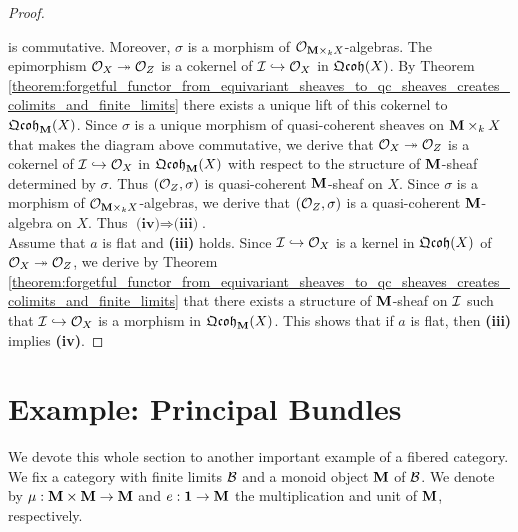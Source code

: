 \begin{proof}
\begin{center}
\end{center}
is commutative. Moreover, $\sigma$ is a morphism of ${\mathcal O}_{\mathbf{M}\times_k X}$-algebras. The epimorphism ${\mathcal O}_X\twoheadrightarrow {\mathcal O}_Z$ is a cokernel of ${\mathcal I}\hookrightarrow {\mathcal O}_X$ in $\mathfrak{Qcoh}(X)$. By Theorem \ref{theorem:forgetful_functor_from_equivariant_sheaves_to_qc_sheaves_creates_colimits_and_finite_limits} there exists a unique lift of this cokernel to $\mathfrak{Qcoh}_{\mathbf{M}}(X)$. Since $\sigma$ is a unique morphism of quasi-coherent sheaves on $\mathbf{M}\times_k X$ that makes the diagram above commutative, we derive that ${\mathcal O}_X\twoheadrightarrow {\mathcal O}_Z$ is a cokernel of ${\mathcal I}\hookrightarrow {\mathcal O}_X$ in $\mathfrak{Qcoh}_{\mathbf{M}}(X)$ with respect to the structure of $\mathbf{M}$-sheaf determined by $\sigma$. Thus $({\mathcal O}_Z,\sigma)$ is quasi-coherent $\mathbf{M}$-sheaf on $X$. Since $\sigma$ is a morphism of ${\mathcal O}_{\mathbf{M}\times_k X}$-algebras, we derive that $({\mathcal O}_Z,\sigma)$ is a quasi-coherent $\mathbf{M}$-algebra on $X$. Thus $\textbf{(iv)}\Rightarrow \textbf{(iii)}$.\\
Assume that $a$ is flat and \textbf{(iii)} holds. Since ${\mathcal I}\hookrightarrow {\mathcal O}_X$ is a kernel in $\mathfrak{Qcoh}(X)$ of ${\mathcal O}_X\twoheadrightarrow {\mathcal O}_Z$, we derive by Theorem \ref{theorem:forgetful_functor_from_equivariant_sheaves_to_qc_sheaves_creates_colimits_and_finite_limits} that there exists a structure of $\mathbf{M}$-sheaf on ${\mathcal I}$ such that ${\mathcal I}\hookrightarrow {\mathcal O}_X$ is a morphism in $\mathfrak{Qcoh}_{\mathbf{M}}(X)$. This shows that if $a$ is flat, then \textbf{(iii)} implies \textbf{(iv)}.
\end{proof}

\section{Example: Principal Bundles}
\noindent
We devote this whole section to another important example of a fibered category. We fix a category with finite limits ${\mathcal B}$ and a monoid object $\mathbf{M}$ of ${\mathcal B}$. We denote by $\mu:\mathbf{M}\times \mathbf{M}\rightarrow \mathbf{M}$ and $e:\mathbf{1}\rightarrow \mathbf{M}$ the multiplication and unit of $\mathbf{M}$, respectively.

